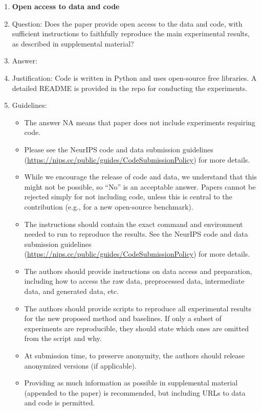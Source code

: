 \documentclass{article}
\begin{document}
\begin{enumerate}
\item {\bf Open access to data and code}
    \item[] Question: Does the paper provide open access to the data and code, with sufficient instructions to faithfully reproduce the main experimental results, as described in supplemental material?
    \item[] Answer: \answerYes{} %
    \item[] Justification: Code is written in Python and uses open-source free libraries. A detailed README is provided in the repo for conducting the experiments.
    \item[] Guidelines:
    \begin{itemize}
        \item The answer NA means that paper does not include experiments requiring code.
        \item Please see the NeurIPS code and data submission guidelines (\url{https://nips.cc/public/guides/CodeSubmissionPolicy}) for more details.
        \item While we encourage the release of code and data, we understand that this might not be possible, so “No” is an acceptable answer. Papers cannot be rejected simply for not including code, unless this is central to the contribution (e.g., for a new open-source benchmark).
        \item The instructions should contain the exact command and environment needed to run to reproduce the results. See the NeurIPS code and data submission guidelines (\url{https://nips.cc/public/guides/CodeSubmissionPolicy}) for more details.
        \item The authors should provide instructions on data access and preparation, including how to access the raw data, preprocessed data, intermediate data, and generated data, etc.
        \item The authors should provide scripts to reproduce all experimental results for the new proposed method and baselines. If only a subset of experiments are reproducible, they should state which ones are omitted from the script and why.
        \item At submission time, to preserve anonymity, the authors should release anonymized versions (if applicable).
        \item Providing as much information as possible in supplemental material (appended to the paper) is recommended, but including URLs to data and code is permitted.
    \end{itemize}



\end{enumerate}
\end{document}
